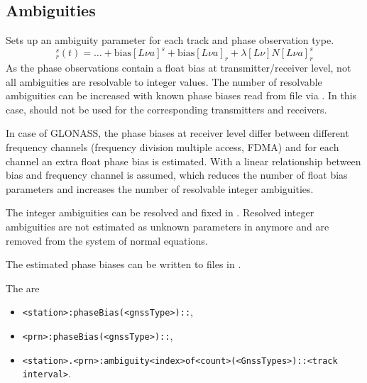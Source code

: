 \subsection{Ambiguities}\label{gnssParametrizationType:ambiguities}
Sets up an ambiguity parameter for each track and phase observation type.
\begin{equation}
  [L\nu a]_r^s(t) = \dots + \text{bias}[L\nu a]^s + \text{bias}[L\nu a]_r + \lambda[L\nu] N[L\nu a]_r^s
\end{equation}
As the phase observations contain a float bias at transmitter/receiver level, not all ambiguities
are resolvable to integer values. The number of resolvable ambiguities can be increased with
known phase biases read from file via .
In this case,  should
not be used for the corresponding transmitters and receivers.

In case of GLONASS, the phase biases at receiver level differ between different frequency channels
(frequency division multiple access, FDMA) and for each channel an extra float phase bias is estimated.
With  a linear relationship between bias and frequency channel is assumed,
which reduces the number of float bias parameters and increases the number of resolvable integer ambiguities.

The integer ambiguities can be resolved and fixed in
.
Resolved integer ambiguities are not estimated as unknown parameters in
 anymore
and are removed from the system of normal equations.

The estimated phase biases can be written to files in
.

The  are
\begin{itemize}
\item \verb|<station>:phaseBias(<gnssType>)::|,
\item \verb|<prn>:phaseBias(<gnssType>)::|,
\item \verb|<station>.<prn>:ambiguity<index>of<count>(<GnssTypes>)::<track interval>|.
\end{itemize}


